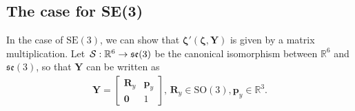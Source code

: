 \subsection{The case for SE(3)}\label{app:prop-Lop-chain-rule-SE3}
In the case of $\text{SE}(3)$, we can show that $\boldsymbol{\zeta}'(\boldsymbol{\zeta}, \mathbf{Y})$ is given by a matrix multiplication. Let $\SL:\mathbb{R}^6\to\mathfrak{se}(3)$ be the canonical isomorphism between $\mathbb{R}^6$ and $\mathfrak{se}(3)$, so that $\mathbf{Y}$ can be written as
\begin{align}
    \mathbf{Y} = \begin{bmatrix}
        \mathbf{R}_y & \mathbf{p}_y\\
        \mathbf{0} & 1
    \end{bmatrix},\,\mathbf{R}_y\in\text{SO}(3), \mathbf{p}_y\in\mathbb{R}^3.
\end{align}


